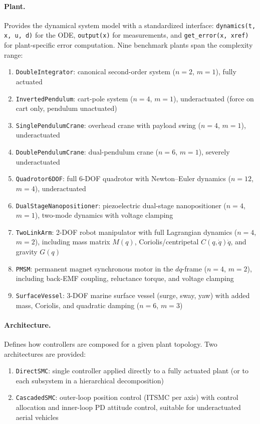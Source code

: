 \documentclass[preprint,12pt]{elsarticle}
\begin{document}
\paragraph{Plant.} Provides the dynamical system model with a standardized interface: \texttt{dynamics(t, x, u, d)} for the ODE, \texttt{output(x)} for measurements, and \texttt{get\_error(x, xref)} for plant-specific error computation. Nine benchmark plants span the complexity range:
\begin{enumerate}
    \item \texttt{DoubleIntegrator}: canonical second-order system ($n=2$, $m=1$), fully actuated
    \item \texttt{InvertedPendulum}: cart-pole system ($n=4$, $m=1$), underactuated (force on cart only, pendulum unactuated)
    \item \texttt{SinglePendulumCrane}: overhead crane with payload swing ($n=4$, $m=1$), underactuated~\cite{qian2015hierarchical}
    \item \texttt{DoublePendulumCrane}: dual-pendulum crane ($n=6$, $m=1$), severely underactuated
    \item \texttt{Quadrotor6DOF}: full 6-DOF quadrotor with Newton--Euler dynamics ($n=12$, $m=4$), underactuated
    \item \texttt{DualStageNanopositioner}: piezoelectric dual-stage nanopositioner ($n=4$, $m=1$), two-mode dynamics with voltage clamping
    \item \texttt{TwoLinkArm}: 2-DOF robot manipulator with full Lagrangian dynamics ($n=4$, $m=2$), including mass matrix $M(q)$, Coriolis/centripetal $C(q,\dot{q})\dot{q}$, and gravity $G(q)$~\cite{slotine1991applied}
    \item \texttt{PMSM}: permanent magnet synchronous motor in the $dq$-frame ($n=4$, $m=2$), including back-EMF coupling, reluctance torque, and voltage clamping~\cite{krause2013analysis}
    \item \texttt{SurfaceVessel}: 3-DOF marine surface vessel (surge, sway, yaw) with added mass, Coriolis, and quadratic damping ($n=6$, $m=3$)~\cite{fossen2011handbook}
\end{enumerate}

\paragraph{Architecture.} Defines how controllers are composed for a given plant topology. Two architectures are provided:
\begin{enumerate}
    \item \texttt{DirectSMC}: single controller applied directly to a fully actuated plant (or to each subsystem in a hierarchical decomposition)
    \item \texttt{CascadedSMC}: outer-loop position control (ITSMC per axis) with control allocation and inner-loop PD attitude control, suitable for underactuated aerial vehicles
\end{enumerate}
\end{document}
